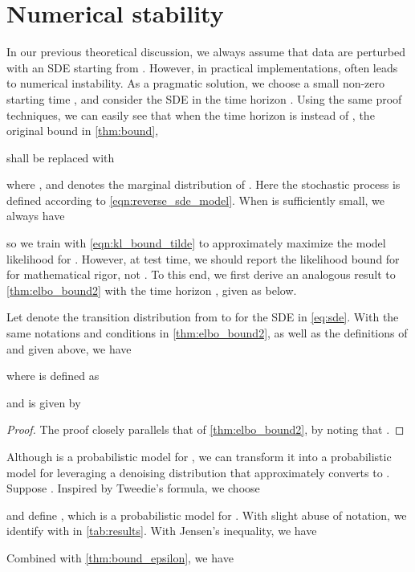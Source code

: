 \section{Numerical stability}\label{app:stability}
In our previous theoretical discussion, we always assume that data are perturbed with an SDE starting from . However, in practical implementations,  often leads to numerical instability. As a pragmatic solution, we choose a small non-zero starting time , and consider the SDE in the time horizon . Using the same proof techniques, we can easily see that when the time horizon is  instead of , the original bound in \cref{thm:bound},

shall be replaced with

where , and  denotes the marginal distribution of . Here the stochastic process  is defined according to \cref{eqn:reverse_sde_model}. When  is sufficiently small, we always have

so we train with \cref{eqn:kl_bound_tilde} to approximately maximize the model likelihood for . However, at test time, we should report the likelihood bound for  for mathematical rigor, not . To this end, we first derive an analogous result to \cref{thm:elbo_bound2} with the time horizon , given as below.
\begin{theorem}\label{thm:bound_epsilon}
Let  denote the transition distribution from  to  for the SDE in \cref{eq:sde}. With the same notations and conditions in \cref{thm:elbo_bound2}, as well as the definitions of  and  given above, we have

where  is defined as

and  is given by
\begin{small}

\end{small}
\end{theorem}
\begin{proof}
The proof closely parallels that of \cref{thm:elbo_bound2}, by noting that .
\end{proof}

Although  is a probabilistic model for , we can transform it into a probabilistic model for  leveraging a denoising distribution  that approximately converts  to . Suppose . Inspired by Tweedie's formula, we choose 

and define , which is a probabilistic model for . With slight abuse of notation, we identify  with  in \cref{tab:results}. With Jensen's inequality, we have

Combined with \cref{thm:bound_epsilon}, we have

